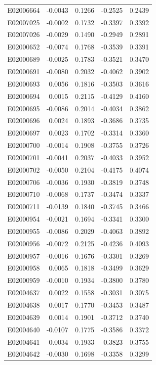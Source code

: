 \documentclass[11pt, a4paper]{article}
\begin{document}
\begin{longtable}{lrrrr}
E02006664 & -0.0043 & 0.1266 & -0.2525 & 0.2439 \\
E02007025 & -0.0002 & 0.1732 & -0.3397 & 0.3392 \\
E02007026 & -0.0029 & 0.1490 & -0.2949 & 0.2891 \\
E02000652 & -0.0074 & 0.1768 & -0.3539 & 0.3391 \\
E02000689 & -0.0025 & 0.1783 & -0.3521 & 0.3470 \\
E02000691 & -0.0080 & 0.2032 & -0.4062 & 0.3902 \\
E02000693 & 0.0056 & 0.1816 & -0.3503 & 0.3616 \\
E02000694 & 0.0015 & 0.2115 & -0.4129 & 0.4160 \\
E02000695 & -0.0086 & 0.2014 & -0.4034 & 0.3862 \\
E02000696 & 0.0024 & 0.1893 & -0.3686 & 0.3735 \\
E02000697 & 0.0023 & 0.1702 & -0.3314 & 0.3360 \\
E02000700 & -0.0014 & 0.1908 & -0.3755 & 0.3726 \\
E02000701 & -0.0041 & 0.2037 & -0.4033 & 0.3952 \\
E02000702 & -0.0050 & 0.2104 & -0.4175 & 0.4074 \\
E02000706 & -0.0036 & 0.1930 & -0.3819 & 0.3748 \\
E02000710 & -0.0068 & 0.1737 & -0.3474 & 0.3337 \\
E02000711 & -0.0139 & 0.1840 & -0.3745 & 0.3466 \\
E02000954 & -0.0021 & 0.1694 & -0.3341 & 0.3300 \\
E02000955 & -0.0086 & 0.2029 & -0.4063 & 0.3892 \\
E02000956 & -0.0072 & 0.2125 & -0.4236 & 0.4093 \\
E02000957 & -0.0016 & 0.1676 & -0.3301 & 0.3269 \\
E02000958 & 0.0065 & 0.1818 & -0.3499 & 0.3629 \\
E02000959 & -0.0010 & 0.1934 & -0.3800 & 0.3780 \\
E02004637 & 0.0022 & 0.1558 & -0.3031 & 0.3075 \\
E02004638 & 0.0017 & 0.1770 & -0.3453 & 0.3487 \\
E02004639 & 0.0014 & 0.1901 & -0.3712 & 0.3740 \\
E02004640 & -0.0107 & 0.1775 & -0.3586 & 0.3372 \\
E02004641 & -0.0034 & 0.1933 & -0.3823 & 0.3755 \\
E02004642 & -0.0030 & 0.1698 & -0.3358 & 0.3299 \\

\end{longtable}
\end{document}
